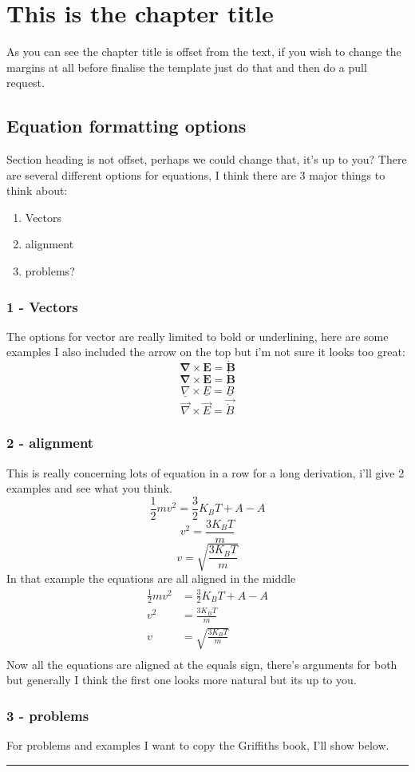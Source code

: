 \documentclass[11pt]{book}
\begin{document}
\chapter{This is the chapter title}
As you can see the chapter title is offset from the text, if you wish to change the margins at all before finalise the template just do that and then do a pull request.
%
\section{Equation formatting options}
Section heading is not offset, perhaps we could change that, it's up to you?
 There are several different options for equations, I think there are 3 major things to think about:
%
\begin{enumerate}
	\item Vectors
	\item alignment
	\item problems?
\end{enumerate}
%
\subsection{1 - Vectors}
The options for vector are really limited to bold or underlining, here are some examples I also included the arrow on the top but i'm not sure it looks too great:
%
$$\mathbf{\nabla}\times\mathbf{E} = \mathbf{\dot{B}}$$
%
$$\pmb{\nabla}\times\pmb{E} = \pmb{\dot{B}}$$
%
$$\underline{\nabla}\times\underline{E} = \underline{\dot{B}}$$
%
$$\vec{\nabla}\times\vec{E} = \vec{\dot{B}}$$
%
\subsection{2 - alignment}
This is really concerning lots of equation in a row for a long derivation, i'll give 2 examples and see what you think.
%
$$\frac{1}{2}mv^2=\frac{3}{2}K_BT + A - A$$
%
$$v^2=\frac{3K_BT}{m}$$
%
$$v=\sqrt{\frac{3K_BT}{m}}$$
%
In that example the equations are all aligned in the middle
%
\begin{align*}	
	\frac{1}{2}mv^2&=\frac{3}{2}K_BT + A - A\\
	v^2&=\frac{3K_BT}{m}\\
	v&=\sqrt{\frac{3K_BT}{m}}\\
\end{align*}
%
Now all the equations are aligned at the equals sign, there's arguments for both but generally I think the first one looks more natural but its up to you.
%
\subsection{3 - problems}
For problems and examples I want to copy the Griffiths book, I'll show below.\\
%
\noindent\rule[0.2ex]{\linewidth}{0.1cm}
\end{document}
